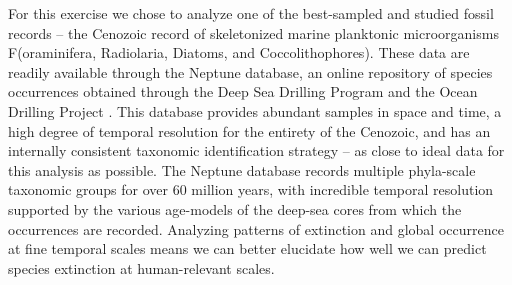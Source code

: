 \documentclass[12pt,letterpaper]{article}
\begin{document}
\begin{refsection}

For this exercise we chose to analyze one of the best-sampled and studied fossil records -- the Cenozoic record of skeletonized marine planktonic microorganisms F(oraminifera, Radiolaria, Diatoms, and Coccolithophores). These data are readily available through the Neptune database, an online repository of species occurrences obtained through the Deep Sea Drilling Program and the Ocean Drilling Project \citep{Lazarus1994,SpencerCervato1999}. This database provides abundant samples in space and time, a high degree of temporal resolution for the entirety of the Cenozoic, and has an internally consistent taxonomic identification strategy -- as close to ideal data for this analysis as possible. 
The Neptune database records multiple phyla-scale taxonomic groups for over 60 million years, with incredible temporal resolution supported by the various age-models of the deep-sea cores from which the occurrences are recorded. Analyzing patterns of extinction and global occurrence at fine temporal scales means we can better elucidate how well we can predict species extinction at human-relevant scales.



\end{refsection}
\end{document}
